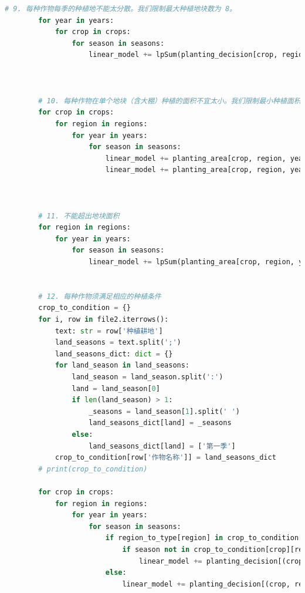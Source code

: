 \documentclass{cumcmthesis}
\begin{document}
\begin{appendices}
\begin{lstlisting}[language=python]
        # 9. 每种作物每季的种植地不能太分散。我们限制最大种植地块数为 8。
        for year in years:
            for crop in crops:
                for season in seasons:
                    linear_model += lpSum(planting_decision[crop, region, year, season] for region in regions) <= 8
    
    
    
        # 10. 每种作物在单个地块（含大棚）种植的面积不宜太小。我们限制最小种植面积为 30%。
        for crop in crops:
            for region in regions:
                for year in years:
                    for season in seasons:
                        linear_model += planting_area[crop, region, year, season] >= 0.3 * region_areas[region] * planting_decision[crop, region, year, season]
                        linear_model += planting_area[crop, region, year, season] <= region_areas[region] * planting_decision[crop, region, year, season]
    
            
    
        # 11. 不能超出地块面积
        for region in regions:
            for year in years:
                for season in seasons:
                    linear_model += lpSum(planting_area[crop, region, year, season] for crop in crops) <= region_areas[region]
    
    
        # 12. 每种作物须满足相应的种植条件
        crop_to_condition = {}
        for i, row in file2.iterrows():
            text: str = row['种植耕地']
            land_seasons = text.split(';')
            land_seasons_dict: dict = {}
            for land_season in land_seasons:
                land_season = land_season.split(':')
                land = land_season[0]
                if len(land_season) > 1:
                    _seasons = land_season[1].split(' ')
                    land_seasons_dict[land] = _seasons
                else:
                    land_seasons_dict[land] = ['第一季']
            crop_to_condition[row['作物名称']] = land_seasons_dict
        # print(crop_to_condition)
    
        for crop in crops:
            for region in regions:
                for year in years:
                    for season in seasons:
                        if region_to_type[region] in crop_to_condition[crop]:
                            if season not in crop_to_condition[crop][region_to_type[region]]:
                                linear_model += planting_decision[(crop, region, year, season)] == 0
                        else:
                            linear_model += planting_decision[(crop, region, year, season)] == 0
                            

\end{lstlisting}
\end{appendices}
\end{document}

